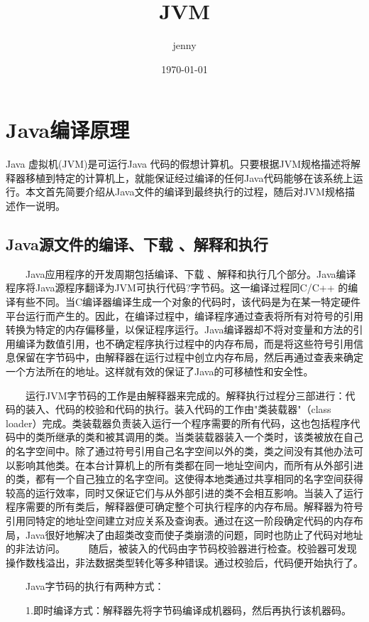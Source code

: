 \documentclass[10pt,b5paper]{article}
\author{jenny}
\date{\today}
\title{JVM}
\begin{document}
\maketitle
\tableofcontents

\small{}
\section{Java编译原理}
\label{sec-1}

Java 虚拟机(JVM)是可运行Java 代码的假想计算机。只要根据JVM规格描述将解释器移植到特定的计算机上，就能保证经过编译的任何Java代码能够在该系统上运行。本文首先简要介绍从Java文件的编译到最终执行的过程，随后对JVM规格描述作一说明。 
　　 
\subsection{Java源文件的编译、下载 、解释和执行}
\label{sec-1-1}
　　Java应用程序的开发周期包括编译、下载 、解释和执行几个部分。Java编译程序将Java源程序翻译为JVM可执行代码?字节码。这一编译过程同C/C++ 的编译有些不同。当C编译器编译生成一个对象的代码时，该代码是为在某一特定硬件平台运行而产生的。因此，在编译过程中，编译程序通过查表将所有对符号的引用转换为特定的内存偏移量，以保证程序运行。Java编译器却不将对变量和方法的引用编译为数值引用，也不确定程序执行过程中的内存布局，而是将这些符号引用信息保留在字节码中，由解释器在运行过程中创立内存布局，然后再通过查表来确定一个方法所在的地址。这样就有效的保证了Java的可移植性和安全性。

　　运行JVM字节码的工作是由解释器来完成的。解释执行过程分三部进行：代码的装入、代码的校验和代码的执行。装入代码的工作由"类装载器"（class loader）完成。类装载器负责装入运行一个程序需要的所有代码，这也包括程序代码中的类所继承的类和被其调用的类。当类装载器装入一个类时，该类被放在自己的名字空间中。除了通过符号引用自己名字空间以外的类，类之间没有其他办法可以影响其他类。在本台计算机上的所有类都在同一地址空间内，而所有从外部引进的类，都有一个自己独立的名字空间。这使得本地类通过共享相同的名字空间获得较高的运行效率，同时又保证它们与从外部引进的类不会相互影响。当装入了运行程序需要的所有类后，解释器便可确定整个可执行程序的内存布局。解释器为符号引用同特定的地址空间建立对应关系及查询表。通过在这一阶段确定代码的内存布局，Java很好地解决了由超类改变而使子类崩溃的问题，同时也防止了代码对地址的非法访问。 
　　随后，被装入的代码由字节码校验器进行检查。校验器可发现操作数栈溢出，非法数据类型转化等多种错误。通过校验后，代码便开始执行了。 

　　Java字节码的执行有两种方式： 

　　1.即时编译方式：解释器先将字节码编译成机器码，然后再执行该机器码。 
\end{document}
